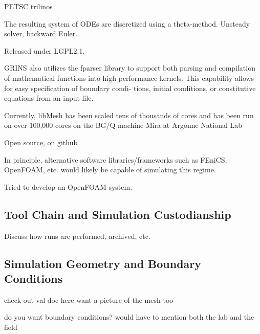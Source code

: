PETSC\cite{petsc} trilinos\cite{trilinos}

The resulting system of ODEs are discretized using a theta-method. 
Unsteady solver, backward Euler. 

Released under LGPL2.1\cite{lgpl}. 

GRINS also utilizes the fparser\cite{fparser}
library to support both parsing and compilation of mathematical
functions into high 
performance kernels. This capability allows for easy specification of
boundary condi- 
tions, initial conditions, or constitutive equations from an input file.

Currently, libMesh has been scaled tens of thousands of cores and has
been run on over 100,000 cores on the BG/Q machine Mira at Argonne National
Lab\cite{libmesh-scaling}

Open source, on github\cite{github}

In principle, alternative software libraries/frameworks such as
FEniCS\cite{fenics}, OpenFOAM\cite{openfoam}, etc. would likely be
capable of simulating this regime. 

Tried to develop an OpenFOAM system.   

\subsection{Tool Chain and Simulation Custodianship}

Discuss how runs are performed, archived, etc. 

\subsection{Simulation Geometry and Boundary Conditions}

check out val doc here
want a picture of the mesh too

do you want boundary conditions? would have to mention both the lab and
the field